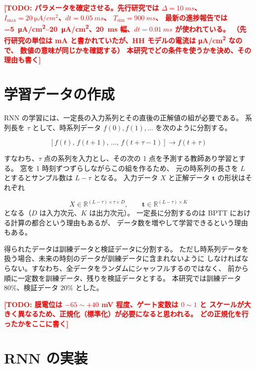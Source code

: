 \documentclass[a4paper,11pt,openany]{ltjsreport}
\newcommand{\TODO}[1]{\textcolor{red}{\textbf{[TODO: #1]}}}
\begin{document}
\TODO{パラメータを確定させる。先行研究\cite{munechika2025}では
      $\Delta = \SI{10}{ms}$、$I_{\max} = \SI{20}{\micro A/cm^2}$、$dt = \SI{0.05}{ms}$、
      $T_{\mathrm{sim}} = \SI{900}{ms}$、
      最新の進捗報告では \SIrange{-5}{20}{\micro A/cm^2}、\SI{20}{ms} 幅、$dt = \SI{0.01}{ms}$ が使われている。
      （先行研究の単位は mA と書かれていたが、HH モデルの電流は \si{\micro A/cm^2} なので、
      数値の意味が同じかを確認する）
      本研究でどの条件を使うかを決め、その理由も書く}

\section{学習データの作成}
\label{sec:dataset}

RNN の学習には、一定長の入力系列とその直後の正解値の組が必要である。
系列長を $\tau$ として、時系列データ $f(0), f(1), \dots$ を次のように分割する。

\begin{equation}
  \left[ f(t),\, f(t+1),\, \dots,\, f(t+\tau-1) \right] \longrightarrow f(t+\tau)
  \label{eq:window}
\end{equation}

すなわち、$\tau$ 点の系列を入力とし、その次の 1 点を予測する教師あり学習とする。
窓を 1 時刻ずつずらしながらこの組を作るため、
元の時系列の長さを $L$ とするとサンプル数は $L - \tau$ となる。
入力データ $X$ と正解データ $\bm{t}$ の形状はそれぞれ

\begin{equation}
  X \in \mathbb{R}^{(L-\tau) \times \tau \times D}, \qquad
  \bm{t} \in \mathbb{R}^{(L-\tau) \times K}
  \label{eq:shapes}
\end{equation}
となる（$D$ は入力次元、$K$ は出力次元）。
一定長に分割するのは BPTT における計算の都合という理由もあるが、
データ数を増やして学習できるという理由もある\cite{sugomori2019}。

得られたデータは訓練データと検証データに分割する。
ただし時系列データを扱う場合、未来の時刻のデータが訓練データに含まれないように
しなければならない。すなわち、全データをランダムにシャッフルするのではなく、
前から順に一定数を訓練データ、残りを検証データとする。
本研究では訓練データ $80\%$、検証データ $20\%$ とした。

\TODO{膜電位は $-65 \sim +40$ mV 程度、ゲート変数は $0 \sim 1$ と
      スケールが大きく異なるため、正規化（標準化）が必要になると思われる。
      どの正規化を行ったかをここに書く}

\section{RNN の実装}
\label{sec:rnn_impl}
\end{document}
